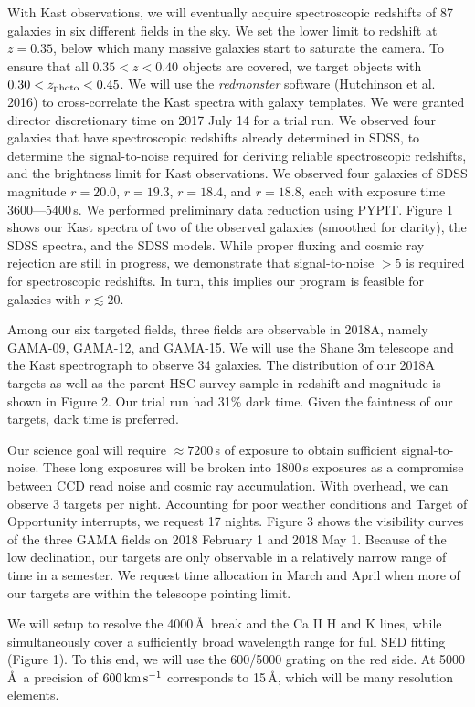 \documentclass[letterpaper,12pt]{article}
\begin{document}
With Kast observations, we will eventually acquire spectroscopic redshifts of 87 galaxies in six different fields in
the sky. We set the lower limit to redshift at $z=0.35$, below which many massive galaxies start to saturate the
camera. To ensure that all $0.35 < z < 0.40$ objects are covered, we target objects with $0.30<z_{\rm photo}<0.45$. We
will use the {\it redmonster} software (Hutchinson et al. 2016) to cross-correlate the Kast spectra with galaxy
templates. We were granted director discretionary time on 2017 July 14 for a trial run. We observed four galaxies that
have spectroscopic redshifts already determined in SDSS, to determine the signal-to-noise required for deriving
reliable spectroscopic redshifts, and the brightness limit for Kast observations. We observed four galaxies of SDSS
magnitude $r=20.0$, $r=19.3$, $r=18.4$, and $r=18.8$, each with exposure time $3600\textrm{---}5400$\,s. We performed
preliminary data reduction using PYPIT. Figure 1 shows our Kast spectra of two of the observed galaxies (smoothed for
clarity), the SDSS spectra, and the SDSS models. While proper fluxing and cosmic ray rejection are still in progress,
we demonstrate that signal-to-noise $>5$ is required for spectroscopic redshifts. In turn, this implies our program is
feasible for galaxies with $r\lesssim20$.

Among our six targeted fields, three fields are observable in 2018A, namely GAMA-09, GAMA-12, and GAMA-15. We will use
the Shane 3m telescope and the Kast spectrograph to observe 34 galaxies. The distribution of our 2018A targets as well
as the parent HSC survey sample in redshift and magnitude is shown in Figure 2. Our trial run had 31\% dark time. Given
the faintness of our targets, dark time is preferred.

Our science goal will require $\approx7200$\,s of exposure to obtain sufficient signal-to-noise. These long exposures
will be broken into 1800\,s exposures as a compromise between CCD read noise and cosmic ray accumulation. With
overhead, we can observe 3 targets per night. Accounting for poor weather conditions and Target of Opportunity
interrupts, we request 17 nights. Figure 3 shows the visibility curves of the three GAMA fields on 2018 February 1 and
2018 May 1. Because of the low declination, our targets are only observable in a relatively narrow range of time in a
semester. We request time allocation in March and April when more of our targets are within the telescope pointing
limit.

We will setup to resolve the 4000\,\AA\ break and the Ca II H and K lines, while simultaneously cover a sufficiently
broad wavelength range for full SED fitting (Figure 1). To this end, we will use the 600/5000 grating on the red side.
At 5000\,\AA\, a precision of $600\,{\rm km\,s^{-1}}$ corresponds to 15\,\AA, which will be many resolution elements.
\end{document}
